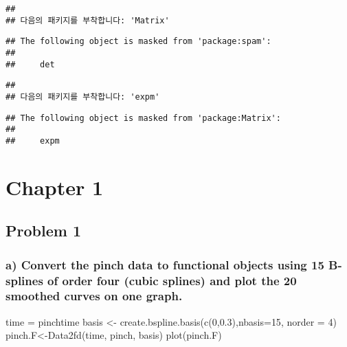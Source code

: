 \documentclass[
]{article}
\newenvironment{Shaded}{\begin{snugshade}}{\end{snugshade}}
\newcommand{\AttributeTok}[1]{\textcolor[rgb]{0.77,0.63,0.00}{#1}}
\newcommand{\DecValTok}[1]{\textcolor[rgb]{0.00,0.00,0.81}{#1}}
\newcommand{\FloatTok}[1]{\textcolor[rgb]{0.00,0.00,0.81}{#1}}
\newcommand{\FunctionTok}[1]{\textcolor[rgb]{0.00,0.00,0.00}{#1}}
\newcommand{\NormalTok}[1]{#1}
\newcommand{\OtherTok}[1]{\textcolor[rgb]{0.56,0.35,0.01}{#1}}
\begin{document}
\begin{verbatim}
## 
## 다음의 패키지를 부착합니다: 'Matrix'
\end{verbatim}

\begin{verbatim}
## The following object is masked from 'package:spam':
## 
##     det
\end{verbatim}

\begin{verbatim}
## 
## 다음의 패키지를 부착합니다: 'expm'
\end{verbatim}

\begin{verbatim}
## The following object is masked from 'package:Matrix':
## 
##     expm
\end{verbatim}

\hypertarget{chapter-1}{%
\section{Chapter 1}\label{chapter-1}}

\hypertarget{problem-1}{%
\subsection{Problem 1}\label{problem-1}}

\hypertarget{a-convert-the-pinch-data-to-functional-objects-using-15-b-splines-of-order-four-cubic-splines-and-plot-the-20-smoothed-curves-on-one-graph.}{%
\subsubsection{a) Convert the pinch data to functional objects using 15
B-splines of order four (cubic splines) and plot the 20 smoothed curves
on one
graph.}\label{a-convert-the-pinch-data-to-functional-objects-using-15-b-splines-of-order-four-cubic-splines-and-plot-the-20-smoothed-curves-on-one-graph.}}

\begin{Shaded}
\begin{Highlighting}[]
\NormalTok{time }\OtherTok{=}\NormalTok{ pinchtime}
\NormalTok{basis }\OtherTok{\textless{}{-}} \FunctionTok{create.bspline.basis}\NormalTok{(}\FunctionTok{c}\NormalTok{(}\DecValTok{0}\NormalTok{,}\FloatTok{0.3}\NormalTok{),}\AttributeTok{nbasis=}\DecValTok{15}\NormalTok{, }\AttributeTok{norder =} \DecValTok{4}\NormalTok{)}
\NormalTok{pinch.F}\OtherTok{\textless{}{-}}\FunctionTok{Data2fd}\NormalTok{(time, pinch, basis)}
\FunctionTok{plot}\NormalTok{(pinch.F)}
\end{Highlighting}
\end{Shaded}
\end{document}
